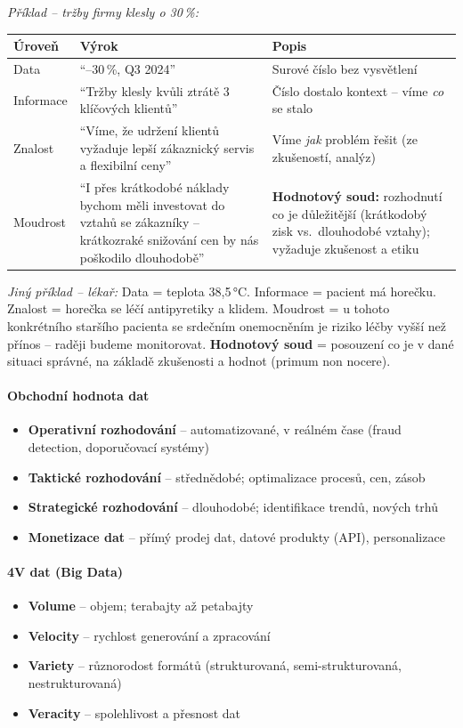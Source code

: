 \textit{Příklad -- tržby firmy klesly o 30\,\%:}
\begin{center}
\begin{tabular}{p{1.6cm}p{4.2cm}p{7cm}}
\toprule
\textbf{Úroveň} & \textbf{Výrok} & \textbf{Popis} \\
\midrule
Data & ``--30\,\%, Q3 2024'' &
  Surové číslo bez vysvětlení \\
Informace & ``Tržby klesly kvůli ztrátě 3 klíčových klientů'' &
  Číslo dostalo kontext -- víme \textit{co} se stalo \\
Znalost & ``Víme, že udržení klientů vyžaduje lepší zákaznický servis a flexibilní ceny'' &
  Víme \textit{jak} problém řešit (ze zkušeností, analýz) \\
Moudrost & ``I přes krátkodobé náklady bychom měli investovat do vztahů se zákazníky -- krátkozraké snižování cen by nás poškodilo dlouhodobě'' &
  \textbf{Hodnotový soud:} rozhodnutí co je důležitější (krátkodobý zisk vs.\ dlouhodobé vztahy); vyžaduje zkušenost a etiku \\
\bottomrule
\end{tabular}
\end{center}

\textit{Jiný příklad -- lékař:} Data = teplota 38,5\,°C. Informace = pacient má horečku.
Znalost = horečka se léčí antipyretiky a klidem. Moudrost = u tohoto konkrétního staršího pacienta
se srdečním onemocněním je riziko léčby vyšší než přínos -- raději budeme monitorovat.
\textbf{Hodnotový soud} = posouzení co je v dané situaci správné, na základě zkušenosti a hodnot (primum non nocere).

\paragraph{Obchodní hodnota dat}
\begin{itemize}
  \item \textbf{Operativní rozhodování} -- automatizované, v reálném čase (fraud detection, doporučovací systémy)
  \item \textbf{Taktické rozhodování} -- střednědobé; optimalizace procesů, cen, zásob
  \item \textbf{Strategické rozhodování} -- dlouhodobé; identifikace trendů, nových trhů
  \item \textbf{Monetizace dat} -- přímý prodej dat, datové produkty (API), personalizace
\end{itemize}

\paragraph{4V dat (Big Data)}
\begin{itemize}
  \item \textbf{Volume} -- objem; terabajty až petabajty
  \item \textbf{Velocity} -- rychlost generování a zpracování
  \item \textbf{Variety} -- různorodost formátů (strukturovaná, semi-strukturovaná, nestrukturovaná)
  \item \textbf{Veracity} -- spolehlivost a přesnost dat
\end{itemize}

